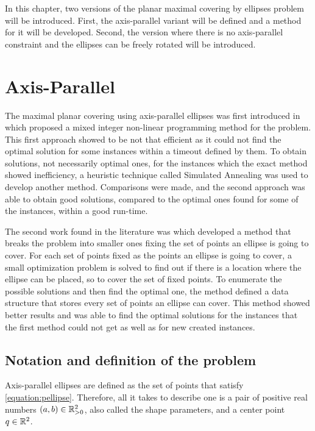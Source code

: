 In this chapter, two versions of the planar maximal covering by ellipses problem will be introduced.
First, the axis-parallel variant will be defined and a method for it will be developed. Second, the version where there is no axis-parallel constraint and the ellipses can be freely rotated will be introduced.

\section{Axis-Parallel}
The maximal planar covering using axis-parallel ellipses was first introduced in \cite{canbolat} which proposed a mixed integer non-linear programming method for the problem. This first approach showed to be not that efficient as it could not find the optimal solution for some instances within a timeout defined by them. To obtain solutions, not necessarily optimal ones, for the instances which the exact method showed inefficiency, a heuristic technique called Simulated Annealing was used to develop another method. Comparisons were made, and the second approach was able to obtain good solutions, compared to the optimal ones found for some of the instances, within a good run-time.

The second work found in the literature was \cite{andreta} which developed a method that breaks the problem into smaller ones fixing the set of points an ellipse is going to cover. For each set of points fixed as the points an ellipse is going to cover, a small optimization problem is solved to find out if there is a location where the ellipse can be placed, so to cover the set of fixed points. To enumerate the possible solutions and then find the optimal one, the method defined a data structure that stores every set of points an ellipse can cover. This method showed better results and was able to find the optimal solutions for the instances that the first method could not get as well as for new created instances.

\subsection{Notation and definition of the problem}

Axis-parallel ellipses are defined as the set of points that satisfy \autoref{equation:pellipse}. Therefore, all it takes to describe one is a pair of positive real numbers $(a,b) \in \mathbb{R}_{>0}^2$, also called the shape parameters, and a center point $q \in \mathbb{R}^2$. 

